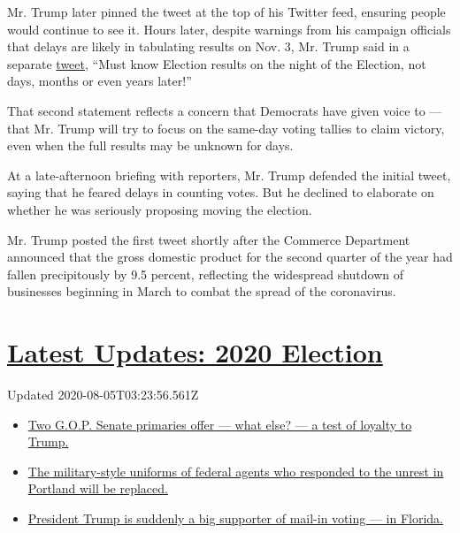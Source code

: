 Mr. Trump later pinned the tweet at the top of his Twitter feed,
ensuring people would continue to see it. Hours later, despite warnings
from his campaign officials that delays are likely in tabulating results
on Nov. 3, Mr. Trump said in a separate
\href{https://twitter.com/realDonaldTrump/status/1288933078287745024?s=20}{tweet},
``Must know Election results on the night of the Election, not days,
months or even years later!''

That second statement reflects a concern that Democrats have given voice
to --- that Mr. Trump will try to focus on the same-day voting tallies
to claim victory, even when the full results may be unknown for days.

At a late-afternoon briefing with reporters, Mr. Trump defended the
initial tweet, saying that he feared delays in counting votes. But he
declined to elaborate on whether he was seriously proposing moving the
election.

Mr. Trump posted the first tweet shortly after the Commerce Department
announced that the gross domestic product for the second quarter of the
year had fallen precipitously by 9.5 percent, reflecting the widespread
shutdown of businesses beginning in March to combat the spread of the
coronavirus.

\hypertarget{latest-updates-2020-election}{%
\section{\texorpdfstring{\href{https://www.nytimes.com/2020/08/04/us/elections/primary-election-michigan-arizona-kansas.html?action=click\&pgtype=Article\&state=default\&region=MAIN_CONTENT_1\&context=storylines_live_updates}{Latest
Updates: 2020
Election}}{Latest Updates: 2020 Election}}\label{latest-updates-2020-election}}

Updated 2020-08-05T03:23:56.561Z

\begin{itemize}
\tightlist
\item
  \href{https://www.nytimes.com/2020/08/04/us/elections/primary-election-michigan-arizona-kansas.html?action=click\&pgtype=Article\&state=default\&region=MAIN_CONTENT_1\&context=storylines_live_updates\#link-3924dd44}{Two
  G.O.P. Senate primaries offer --- what else? --- a test of loyalty to
  Trump.}
\item
  \href{https://www.nytimes.com/2020/08/04/us/elections/primary-election-michigan-arizona-kansas.html?action=click\&pgtype=Article\&state=default\&region=MAIN_CONTENT_1\&context=storylines_live_updates\#link-62a8e06b}{The
  military-style uniforms of federal agents who responded to the unrest
  in Portland will be replaced.}
\item
  \href{https://www.nytimes.com/2020/08/04/us/elections/primary-election-michigan-arizona-kansas.html?action=click\&pgtype=Article\&state=default\&region=MAIN_CONTENT_1\&context=storylines_live_updates\#link-32b39e33}{President
  Trump is suddenly a big supporter of mail-in voting --- in Florida.}
\end{itemize}

